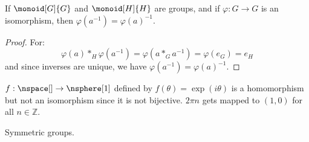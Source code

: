 \documentclass{book}                                                           %
\begin{document}
        \begin{theorem}
            If $\monoid[G]{G}$ and $\monoid[H]{H}$ are groups, and if
            $\varphi:G\rightarrow{G}$ is an isomorphism, then
            $\varphi(a^{\minus{1}})=\varphi(a)^{\minus{1}}$.
        \end{theorem}
        \begin{proof}
            For:
            \begin{equation}
                \varphi(a)*_{H}\varphi(a^{\minus{1}})
                    =\varphi(a*_{G}a^{\minus{1}})
                    =\varphi(e_{G})
                    =e_{H}
            \end{equation}
            and since inverses are unique, we have
            $\varphi(a^{\minus{1}})=\varphi(a)^{\minus{1}}$.
        \end{proof}
        \begin{example}
            $f:\nspace[]\rightarrow\nsphere[1]$ defined by
            $f(\theta)=\exp(i\theta)$ is a homomorphism but not an
            isomorphism since it is not bijective. $2\pi{n}$ gets mapped to
            $(1,0)$ for all $n\in\mathbb{Z}$.
        \end{example}
        Symmetric groups.
\end{document}
